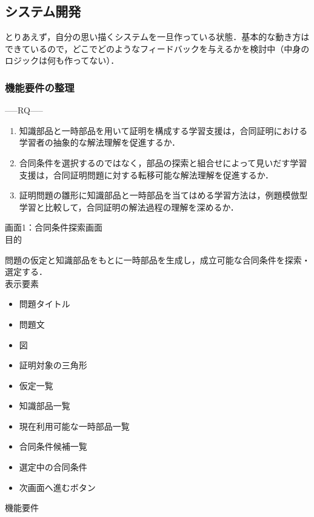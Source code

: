 \documentclass[a4paper,12pt]{ltjsarticle}
\begin{document}
\subsection{システム開発}
とりあえず，自分の思い描くシステムを一旦作っている状態．基本的な動き方はできているので，どこでどのようなフィードバックを与えるかを検討中（中身のロジックは何も作ってない）．

\subsubsection{機能要件の整理}
-----RQ-----
\begin{enumerate}
  \item 知識部品と一時部品を用いて証明を構成する学習支援は，合同証明における学習者の抽象的な解法理解を促進するか．
  \item 合同条件を選択するのではなく，部品の探索と組合せによって見いだす学習支援は，合同証明問題に対する転移可能な解法理解を促進するか．
  \item 証明問題の雛形に知識部品と一時部品を当てはめる学習方法は，例題模倣型学習と比較して，合同証明の解法過程の理解を深めるか．
\end{enumerate}

画面1：合同条件探索画面\\

目的

問題の仮定と知識部品をもとに一時部品を生成し，成立可能な合同条件を探索・選定する．\\

表示要素
\begin{itemize}
  \item 問題タイトル
  \item 問題文
  \item 図
  \item 証明対象の三角形
  \item 仮定一覧
  \item 知識部品一覧
  \item 現在利用可能な一時部品一覧
  \item 合同条件候補一覧
  \item 選定中の合同条件
  \item 次画面へ進むボタン\\
\end{itemize}

機能要件
\end{document}
